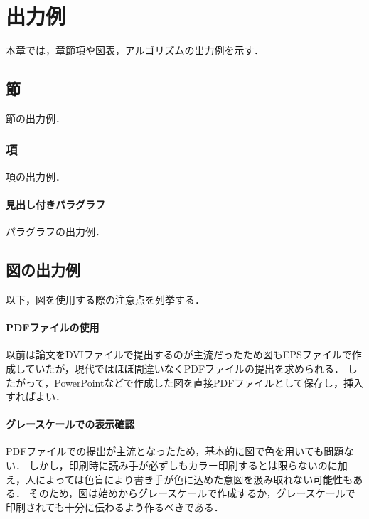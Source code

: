 
\section{出力例}

本章では，章節項や図表，アルゴリズムの出力例を示す．



\subsection{節}

節の出力例．


\subsubsection{項}

項の出力例．

\paragraph{見出し付きパラグラフ}

パラグラフの出力例．



\subsection{図の出力例}


以下，図を使用する際の注意点を列挙する．

\paragraph{PDFファイルの使用}

以前は論文をDVIファイルで提出するのが主流だったため図もEPSファイルで作成していたが，現代ではほぼ間違いなくPDFファイルの提出を求められる．
したがって，PowerPointなどで作成した図を直接PDFファイルとして保存し，挿入すればよい．

\paragraph{グレースケールでの表示確認}

PDFファイルでの提出が主流となったため，基本的に図で色を用いても問題ない．
しかし，印刷時に読み手が必ずしもカラー印刷するとは限らないのに加え，人によっては色盲により書き手が色に込めた意図を汲み取れない可能性もある．
そのため，図は始めからグレースケールで作成するか，グレースケールで印刷されても十分に伝わるよう作るべきである．

